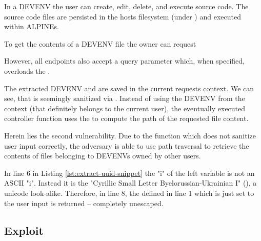 \documentclass[10pt]{article}
\begin{document}
In a DEVENV the user can create, edit, delete, and execute source code. The source code files are persisted in the hosts filesystem (under ) and executed within ALPINEs.

To get the contents of a DEVENV file the owner can request
\begin{center}
\end{center}
However, all  endpoints also accept a query parameter  which, when specified, overloads the .



The extracted DEVENV and  are saved in the current requests context. We can see, that  is seemingly sanitized via . Instead of using the DEVENV from the context (that definitely belongs to the current user), the eventually executed controller function  uses the  to compute the path of the requested file content.



Herein lies the second vulnerability. Due to the  function which does not sanitize user input correctly, the adversary is able to use path traversal to retrieve the contents of files belonging to DEVENVs owned by other users.



In line 6 in Listing \ref{lst:extract-uuid-snippet} the "i" of the left  variable is not an ASCII "i". Instead it is the "Cyrillic Small Letter Byelorussian-Ukrainian I" (), a unicode look-alike. Therefore, in line 8, the  defined in line 1 which is just set to the user input is returned -- completely unescaped.

\subsection{Exploit}
\end{document}
